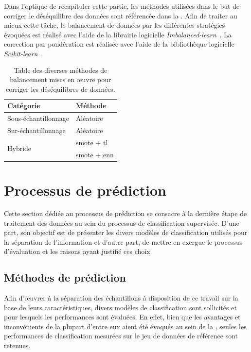 Dans l'optique de récapituler cette partie, les méthodes utilisées dans le but de corriger le déséquilibre des données sont référencée dans la . Afin de traiter au mieux cette tâche, le balancement de données par les différentes stratégies évoquées est réalisé avec l'aide de la librairie logicielle \textit{Imbalanced-learn}~\cite{Lemaitre2017}. La correction par pondération est réalisée avec l'aide de la bibliothèque logicielle \textit{Scikit-learn}~\cite{pedregosa2011}.\par

\begin{table}[H]
    \centering
    \begin{tabular}{ll}
        \toprule
        \textbf{Catégorie}                  & \textbf{Méthode}          \\ \hline
        Sous-échantillonnage                & Aléatoire                 \\ \hline
        Sur-échantillonnage                 & Aléatoire                 \\ \hline
        \multirow{2}{*}{Hybride}            & \gls{smote} + \gls{tl}    \\ \cline{2-2}
                                            & \gls{smote} + \gls{enn}   \\ \bottomrule
    \end{tabular}
    \caption{Table des diverses méthodes de balancement mises en œuvre pour corriger les déséquilibres de données.}
    \label{tab:summary_balancement_methods}
\end{table}\par

\section{Processus de prédiction}
Cette section dédiée au processus de prédiction se consacre à la dernière étape de traitement des données au sein du processus de classification supervisée. D'une part, son objectif est de présenter les divers modèles de classification utilisés pour la séparation de l'information et d'autre part, de mettre en exergue le processus d'évaluation et les raisons ayant justifié ces choix.\par

\subsection{Méthodes de prédiction}
Afin d'œuvrer à la séparation des échantillons à disposition de ce travail sur la base de leurs caractéristiques, divers modèles de classification sont sollicités et pour lesquels les performances sont évaluées. En effet, bien que les avantages et inconvénients de la plupart d'entre eux aient été évoqués au sein de la , seules les performances de classification mesurées sur le jeu de données de référence sont retenues.\par

